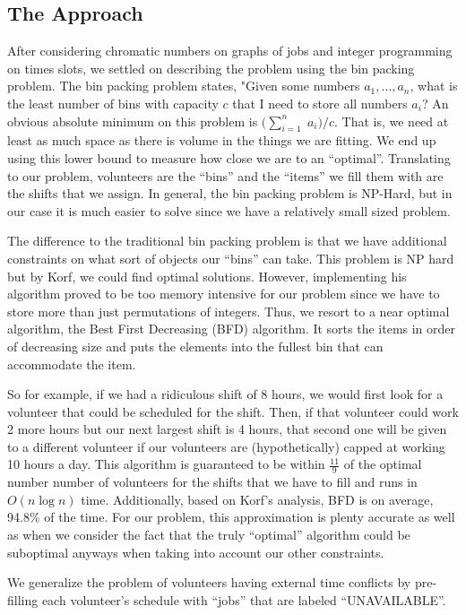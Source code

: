 \documentclass[12pt]{article}
\theoremstyle{definition}
\begin{document}
\begin{multicols}{2}
\section{The Approach}
After considering chromatic numbers on graphs of jobs and integer programming on times slots, we settled on describing the problem using the bin packing problem.
The bin packing problem states, "Given some numbers $a_1, \ldots, a_n$, what is the least number of bins with capacity $c$ that I need to store all numbers $a_i$?
An obvious absolute minimum on this problem is $\big(\sum_{i = 1}^{n}\;a_i\big)/c$.
That is, we need at least as much space as there is volume in the things we are fitting.
We end up using this lower bound to measure how close we are to an ``optimal''.
Translating to our problem, volunteers are the ``bins'' and the ``items'' we fill them with are the shifts that we assign.
In general, the bin packing problem is NP-Hard, but in our case it is much easier to solve since we have a relatively small sized problem.

The difference to the traditional bin packing problem is that we have additional constraints on what sort of objects our ``bins'' can take.
This problem is NP hard but by Korf, we could find optimal solutions.
However, implementing his algorithm proved to be too memory intensive for our problem since we have to store more than just permutations of integers.
Thus, we resort to a near optimal algorithm, the Best First Decreasing (BFD) algorithm.
It sorts the items in order of decreasing size and puts the elements into the fullest bin that can accommodate the item.

So for example, if we had a ridiculous shift of 8 hours, we would first look for a volunteer that could be scheduled for the shift.
Then, if that volunteer could work 2 more hours but our next largest shift is 4 hours, that second one will be given to a different volunteer if our volunteers are (hypothetically) capped at working 10 hours a day.
This algorithm is guaranteed to be within $\frac{11}{9}$ of the optimal number number of volunteers for the shifts that we have to fill and runs in $O(n\log n)$ time.
Additionally, based on Korf's analysis, BFD is on average, 94.8\% of the time.
For our problem, this approximation is plenty accurate as well as when we consider the fact that the truly ``optimal'' algorithm could be suboptimal anyways when taking into account our other constraints.

We generalize the problem of volunteers having external time conflicts by pre-filling each volunteer's schedule with ``jobs'' that are labeled ``UNAVAILABLE''.


\end{multicols}
\end{document}
